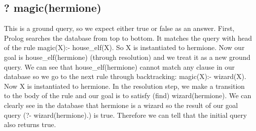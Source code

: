 \subsection{? magic(hermione)}
This is a ground query, so we expect either true or false as an answer. First, Prolog searches the
database from top to bottom. It matches the query with head of the rule magic(X):- house\_elf(X). So X is
instantiated to hermione. Now our goal is house\_elf(hermione) (through resolution) and we treat it as a
new ground query. We can see that house\_elf(hermione) cannot match any clause in our database so
we go to the next rule through backtracking: magic(X):- wizard(X). Now X is instantiated to hermione. In
the resolution step, we make a transition to the body of the rule and our goal is to satisfy (find) wizard(hermione). We can clearly see in the database that hermione is a wizard so the result of our goal
query (?- wizard(hermione).) is true. Therefore we can tell that the initial query also returns true.

